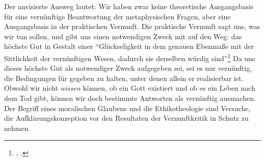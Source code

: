 Der anvisierte Ausweg lautet: Wir haben zwar keine theoretische
Ausgangsbasis für eine vernünftige Beantwortung der metaphysischen Fragen, aber eine
Ausgangsbasis in der praktischen Vernunft. Die praktische Vernunft sagt uns, was
wir tun sollen, und gibt uns einen notwendigen Zweck mit auf den Weg: das
höchste Gut in Gestalt einer \enquote{Glückseligkeit {\punkt} in dem genauen
Ebenmaße mit der Sittlichkeit der vernünftigen Wesen, dadurch sie derselben
würdig sind}\footnote{\cite[][B 842]{Kant:KritikderreinenVernunft2003},
\cite[][III: 528.13--14]{Kant:GesammelteWerke1900ff.}.} Da uns dieses höchste
Gut als notwendiger Zweck aufgegeben sei, sei es nur vernünftig, die Bedingungen
für gegeben zu halten, unter denen allein er realisierbar ist. Obwohl wir nicht
\emph{wissen} können, ob ein Gott existiert und ob es ein Leben nach dem Tod
gibt, können wir doch bestimmte Antworten als vernünftig ausmachen. Der Begriff
eines moralischen Glaubens und die Ethikotheologie sind Versuche, die
Aufklärungskonzeption vor den Resultaten der Vernunftkritik in Schutz zu nehmen.